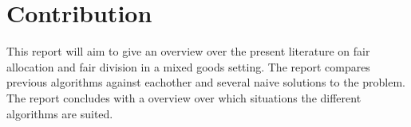 \chapter{Contribution}\label{chp:contribution}

This report will aim to give an overview over the present literature on fair allocation and fair division in a mixed goods setting. The report compares previous algorithms against eachother and several naive solutions to the problem. The report concludes with a overview over which situations the different algorithms are suited.